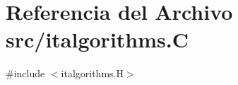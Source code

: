 \hypertarget{italgorithms_8_c}{}\section{Referencia del Archivo src/italgorithms.C}
\label{italgorithms_8_c}
{\ttfamily \#include $<$italgorithms.\+H$>$}\newline
